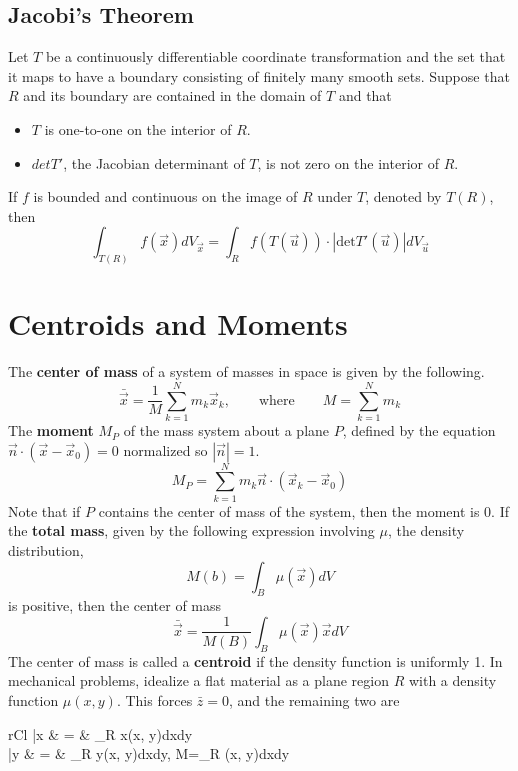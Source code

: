 \documentclass[11pt]{article}
\begin{document}
		\subsection{Jacobi's Theorem}
			Let $T$ be a continuously differentiable coordinate transformation and the set that it maps to have a boundary consisting of finitely many smooth sets. Suppose that $R$ and its boundary are contained in the domain of $T$ and that
			\begin{itemize}
				\item $T$ is one-to-one on the interior of $R$.
				\item $det T'$, the Jacobian determinant of $T$, is not zero on the interior of $R$.
			\end{itemize}
			If $f$ is bounded and continuous on the image of $R$ under $T$, denoted by $T(R)$, then
			\begin{equation}
				\int_{T(R)} f(\vec{x})dV_{\vec{x}} = \int_R f(T(\vec{u}))\cdot|\text{det}T'(\vec{u})|dV_{\vec{u}}
			\end{equation}
			
\section{Centroids and Moments}
	The \textbf{center of mass} of a system of masses in space is given by the following.
	\begin{equation}
		\bar{\vec{x}} = \frac{1}{M}\sum_{k=1}^N m_k\vec{x}_k, \qquad \text{where} \qquad M=\sum_{k=1}^N m_k
	\end{equation}
	The \textbf{moment} $M_P$ of the mass system about a plane $P$, defined by the equation $\vec{n} \cdot (\vec{x} - \vec{x}_0) = 0$ normalized so $|\vec{n}| = 1$.
	\begin{equation}
		M_P = \sum_{k=1}^N m_k\vec{n} \cdot (\vec{x}_k - \vec{x}_0)
	\end{equation}
	Note that if $P$ contains the center of mass of the system, then the moment is 0. If the \textbf{total mass}, given by the following expression involving $\mu$, the density distribution,
	\begin{equation}
		M(b) = \int_B \mu(\vec{x})dV
	\end{equation}
	is positive, then the center of mass
	\begin{equation}
		\bar{\vec{x}} = \frac{1}{M(B)} \int_B \mu(\vec{x})\vec{x}dV
	\end{equation}
	The center of mass is called a  \textbf{centroid} if the density function is uniformly 1. In mechanical problems, idealize a flat material as a plane region $R$ with a density function $\mu(x, y)$. This forces $\bar{z}=0$, and the remaining two are
	\begin{IEEEeqnarray}{rCl}
		\bar{x} & = &  \int_R x\mu(x, y)dxdy \\
		\bar{y} & = &  \int_R y\mu(x, y)dxdy, \quad {} M=\int_R \mu(x, y)dxdy
	\end{IEEEeqnarray}
	
\end{document}
